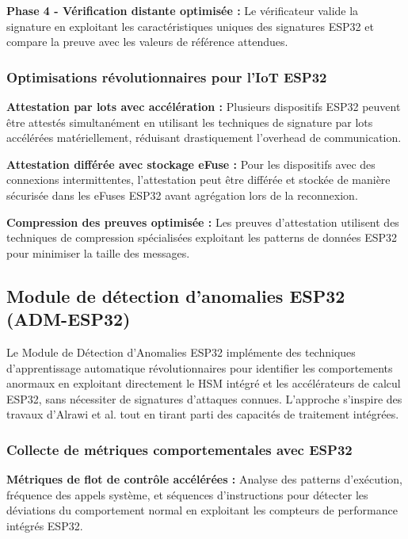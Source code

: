 \textbf{Phase 4 - Vérification distante optimisée :} Le vérificateur valide la signature en exploitant les caractéristiques uniques des signatures ESP32 et compare la preuve avec les valeurs de référence attendues.

\subsubsection{Optimisations révolutionnaires pour l'IoT ESP32}

\textbf{Attestation par lots avec accélération :} Plusieurs dispositifs ESP32 peuvent être attestés simultanément en utilisant les techniques de signature par lots accélérées matériellement, réduisant drastiquement l'overhead de communication.

\textbf{Attestation différée avec stockage eFuse :} Pour les dispositifs avec des connexions intermittentes, l'attestation peut être différée et stockée de manière sécurisée dans les eFuses ESP32 avant agrégation lors de la reconnexion.

\textbf{Compression des preuves optimisée :} Les preuves d'attestation utilisent des techniques de compression spécialisées exploitant les patterns de données ESP32 pour minimiser la taille des messages.

\subsection{Module de détection d'anomalies ESP32 (ADM-ESP32)}

Le Module de Détection d'Anomalies ESP32 implémente des techniques d'apprentissage automatique révolutionnaires pour identifier les comportements anormaux en exploitant directement le HSM intégré et les accélérateurs de calcul ESP32, sans nécessiter de signatures d'attaques connues. L'approche s'inspire des travaux d'Alrawi et al. \cite{Alrawi2023MachineLearning} tout en tirant parti des capacités de traitement intégrées.

\subsubsection{Collecte de métriques comportementales avec ESP32}

\textbf{Métriques de flot de contrôle accélérées :} Analyse des patterns d'exécution, fréquence des appels système, et séquences d'instructions pour détecter les déviations du comportement normal en exploitant les compteurs de performance intégrés ESP32.

